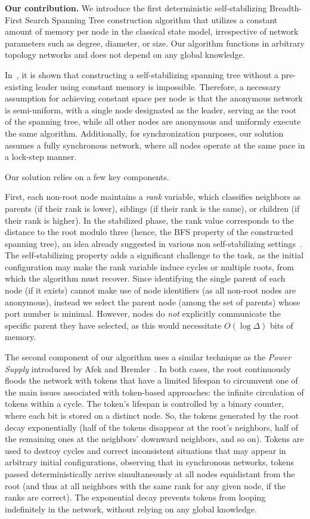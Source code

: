\documentclass[a4paper, 12pt]{article}
\begin{document}
\noindent\textbf{Our contribution.}
We introduce the first deterministic self-stabilizing Breadth-First Search Spanning Tree construction algorithm that utilizes a constant amount of memory per node in the classical state model, irrespective of network parameters such as degree, diameter, or size. Our algorithm functions in arbitrary topology networks and does not depend on any global knowledge.

In~\cite{BFB23}, it is shown that constructing a self-stabilizing spanning tree without a pre-existing leader using constant memory is impossible. Therefore, a necessary assumption for achieving constant space per node is that the anonymous network is semi-uniform, with a single node designated as the leader, serving as the root of the spanning tree, while all other nodes are anonymous and uniformly execute the same algorithm. Additionally, for synchronization purposes, our solution assumes a fully synchronous network, where all nodes operate at the same pace in a lock-step manner.

Our solution relies on a few key components. 

First, each non-root node maintains a \textit{rank} variable, which classifies neighbors as parents (if their rank is lower), siblings (if their rank is the same), or children (if their rank is higher). 
In the stabilized phase, the rank value corresponds to the distance to the root modulo three (hence, the BFS property of the constructed spanning tree), an idea already suggested in various non self-stabilizing settings~\cite{A05,BDLP08,CFIKP08}. The self-stabilizing property adds a significant challenge to the task, as the initial configuration may make the rank variable induce cycles or multiple roots, from which the algorithm must recover. 
Since identifying the single parent of each node (if it exists) cannot make use of node identifiers (as all non-root nodes are anonymous), instead we select the parent node (among the set of parents) whose port number is minimal.
However, nodes do \textit{not} explicitly communicate the specific parent they have selected, as this would necessitate $O(\log \Delta)$ bits of memory.

The second component of our algorithm uses a similar technique as the \emph{Power Supply} introduced by Afek and Bremler~\cite{AB98}.
In both cases, the root continuously floods the network with tokens that have a limited lifespan to
circumvent one of the main issues associated with token-based approaches: the infinite circulation of tokens within a
cycle.  
The token's lifespan is controlled by a binary counter, where each bit is stored on a distinct node. So, the tokens generated by the root decay exponentially (half of the tokens disappear at the root's neighbors, half of the remaining ones at the neighbors' downward neighbors, and so on). Tokens are used to destroy cycles and correct inconsistent situations that may appear in arbitrary initial configurations, observing that in synchronous networks, tokens passed deterministically arrive simultaneously at all nodes equidistant from the root (and thus at all neighbors with the same rank for any given node, if the ranks are correct). The exponential decay prevents tokens from looping indefinitely in the network, without relying on any global knowledge.
\end{document}
